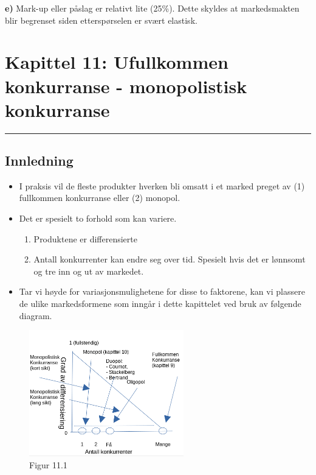 \documentclass[
  letterpaper,
  DIV=11,
  numbers=noendperiod]{scrartcl}
\providecommand{\tightlist}{%
  \setlength{\itemsep}{0pt}\setlength{\parskip}{0pt}}\usepackage{longtable,booktabs,array}
\begin{document}
\textbf{e)} Mark-up eller påslag er relativt lite (25\%). Dette skyldes
at markedsmakten blir begrenset siden etterspørselen er svært elastisk.

\section{Kapittel 11: Ufullkommen konkurranse - monopolistisk
konkurranse}\label{kapittel-11-ufullkommen-konkurranse---monopolistisk-konkurranse}

\begin{center}\rule{0.5\linewidth}{0.5pt}\end{center}

\subsection{Innledning}\label{innledning-5}

\begin{itemize}
\tightlist
\item
  I praksis vil de fleste produkter hverken bli omsatt i et marked
  preget av (1) fullkommen konkurranse eller (2) monopol.
\item
  Det er spesielt to forhold som kan variere.

  \begin{enumerate}
  \def\labelenumi{\arabic{enumi}.}
  \tightlist
  \item
    Produktene er differensierte
  \item
    Antall konkurrenter kan endre seg over tid. Spesielt hvis det er
    lønnsomt og tre inn og ut av markedet.
  \end{enumerate}
\item
  Tar vi høyde for variasjonsmulighetene for disse to faktorene, kan vi
  plassere de ulike markedsformene som inngår i dette kapittelet ved
  bruk av følgende diagram.
\end{itemize}

\begin{figure}[H]

{\centering \includegraphics[width=0.6\textwidth,height=\textheight]{drawio/markedsf.png}

}

\caption{Figur 11.1}

\end{figure}%
\end{document}
